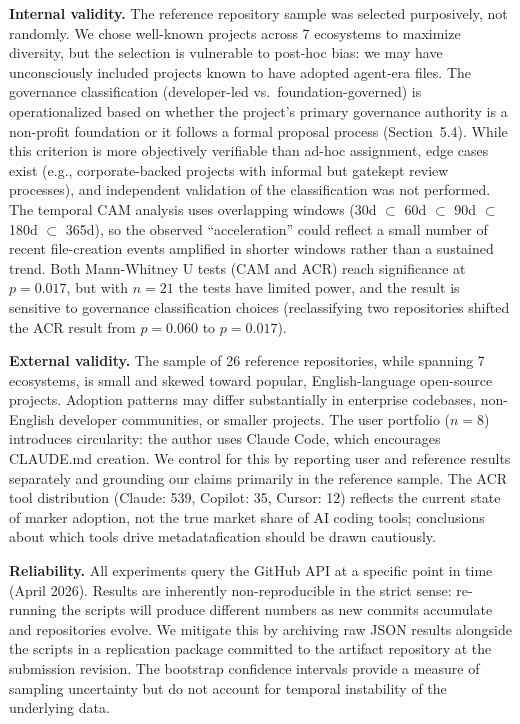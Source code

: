 \documentclass[sigconf, nonacm, anonymous=false]{acmart}
\begin{document}
\textbf{Internal validity.} The reference repository sample was selected purposively, not randomly. We chose well-known projects across 7 ecosystems to maximize diversity, but the selection is vulnerable to post-hoc bias: we may have unconsciously included projects known to have adopted agent-era files. The governance classification (developer-led vs.\ foundation-governed) is operationalized based on whether the project's primary governance authority is a non-profit foundation or it follows a formal proposal process (Section~5.4). While this criterion is more objectively verifiable than ad-hoc assignment, edge cases exist (e.g., corporate-backed projects with informal but gatekept review processes), and independent validation of the classification was not performed. The temporal CAM analysis uses overlapping windows (30d $\subset$ 60d $\subset$ 90d $\subset$ 180d $\subset$ 365d), so the observed ``acceleration'' could reflect a small number of recent file-creation events amplified in shorter windows rather than a sustained trend. Both Mann-Whitney U tests (CAM and ACR) reach significance at $p=0.017$, but with $n=21$ the tests have limited power, and the result is sensitive to governance classification choices (reclassifying two repositories shifted the ACR result from $p=0.060$ to $p=0.017$).

\textbf{External validity.} The sample of 26 reference repositories, while spanning 7 ecosystems, is small and skewed toward popular, English-language open-source projects. Adoption patterns may differ substantially in enterprise codebases, non-English developer communities, or smaller projects. The user portfolio ($n=8$) introduces circularity: the author uses Claude Code, which encourages CLAUDE.md creation. We control for this by reporting user and reference results separately and grounding our claims primarily in the reference sample. The ACR tool distribution (Claude: 539, Copilot: 35, Cursor: 12) reflects the current state of marker adoption, not the true market share of AI coding tools; conclusions about which tools drive metadatafication should be drawn cautiously.

\textbf{Reliability.} All experiments query the GitHub API at a specific point in time (April 2026). Results are inherently non-reproducible in the strict sense: re-running the scripts will produce different numbers as new commits accumulate and repositories evolve. We mitigate this by archiving raw JSON results alongside the scripts in a replication package committed to the artifact repository at the submission revision. The bootstrap confidence intervals provide a measure of sampling uncertainty but do not account for temporal instability of the underlying data.
\end{document}
